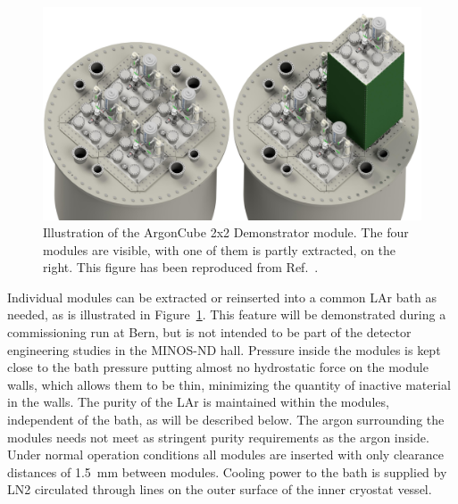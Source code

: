 \begin{figure}[htbp]
\centering
\includegraphics[width=\textwidth]{plots/BathAndModule}
\caption{Illustration of the ArgonCube 2x2 Demonstrator module. The four modules are visible, with one of them is partly extracted, on the right. This figure has been reproduced from Ref.~\cite{argoncube_loi}.}
\label{fig:2x2_extraction}
\end{figure}

Individual modules can be extracted or reinserted into a common LAr bath as needed, as is illustrated in Figure~\ref{fig:2x2_extraction}. This feature will be demonstrated during a commissioning run at Bern, but is not intended to be part of the detector engineering studies in the MINOS-ND hall. Pressure inside the modules is kept close to the bath pressure putting almost no hydrostatic force on the module walls, which allows them to be thin, minimizing the quantity of inactive material in the walls. The purity of the LAr is maintained within the modules, independent of the bath, as will be described below. The argon surrounding the modules needs not meet as stringent purity requirements as the argon inside. Under normal operation conditions all modules are inserted with only clearance distances of \SI{1.5}{\milli\metre} between modules. Cooling power to the bath is supplied by LN2 circulated through lines on the outer surface of the inner cryostat vessel.


